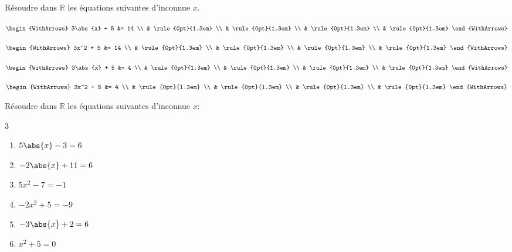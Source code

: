 \begin{example} Résoudre dans $\mathbb{R}$ les équations suivantes d'inconnue $x$.
	
	\noindent \parbox{0.22\linewidth}{	
		$\begin{WithArrows}
			3\abs{x} + 5 &=  14 \\ 
			& \rule{0pt}{1.3em}  \\
			&  \rule{0pt}{1.3em} \\
			&   \rule{0pt}{1.3em}  \\
			&   \rule{0pt}{1.3em}  
		\end{WithArrows}$ 	
	}\hfill \parbox{0.22\linewidth}{	
		$\begin{WithArrows}
			3x^2 + 5 &=  14 \\ 
			& \rule{0pt}{1.3em}  \\
			&  \rule{0pt}{1.3em} \\
			&   \rule{0pt}{1.3em}  \\
			&   \rule{0pt}{1.3em}  
		\end{WithArrows}$ 	
	} \hfill \parbox{0.22\linewidth}{	
		$\begin{WithArrows}
			3\abs{x} + 5 &=  4 \\ 
			& \rule{0pt}{1.3em}  \\
			&  \rule{0pt}{1.3em} \\
			&   \rule{0pt}{1.3em}  \\
			&   \rule{0pt}{1.3em}  
		\end{WithArrows}$ 	
	}\hfill \parbox{0.22\linewidth}{	
		$\begin{WithArrows}
			3x^2 + 5 &=  4 \\ 
			& \rule{0pt}{1.3em}  \\
			&  \rule{0pt}{1.3em} \\
			&   \rule{0pt}{1.3em}   \\
			&   \rule{0pt}{1.3em} 
		\end{WithArrows}$ 	
	} 
\end{example}
\begin{exercise}\label{chapter07:exercice:equationD} Résoudre dans $\mathbb{R}$ les équations suivantes d'inconnue $x$: \hfill  
	 
	\begin{multicols}{3}
		\begin{enumerate}[label={$(E_{\arabic*})$}, leftmargin=*]
			\item  $5\abs{x}-3=6$
			\item  $-2\abs{x}+11=6$
			\item  $5x^2-7=-1$
			\item  $-2x^2+5=-9$
			\item  $-3\abs{x}+2=6$
			\item  $x^2+5=0$
		\end{enumerate}
	\end{multicols} 	
\end{exercise}

